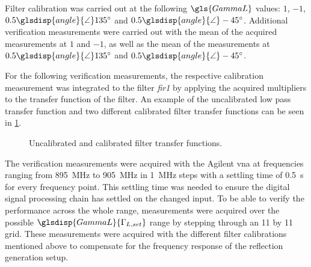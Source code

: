 \documentclass[12pt,a4paper,parskip=full,abstract=true,BCOR=12mm,twoside,open=right]{scrreprt}
\providecommand{\abs}[1]{\lvert#1\rvert}
\def\device#1{\textit{#1}}
\newcommand{\Angle}{\glsdisp{angle}{\angle}}
\begin{document}
Filter calibration was carried out at the following $\gls{GammaL}$
values: $1$, $-1$, $0.5\Angle\SI{135}{\degree}$ and $0.5\Angle\SI{-45}{\degree}$. Additional
verification measurements were carried out with the mean of the acquired measurements
at $1$ and $-1$, as well as the mean of the measurements at $0.5\Angle\SI{135}{\degree}$
and $0.5\Angle\SI{-45}{\degree}$.

For the following verification measurements, the respective calibration measurement
was integrated to the filter \device{fir1} by applying the acquired multipliers
to the transfer function of the filter. An example of the uncalibrated low pass
transfer function and two different calibrated filter transfer functions can be
seen in \cref{fig:filter}.

\begin{figure}[htb]
    \centering
    \caption{Uncalibrated and calibrated filter transfer functions.}
    \label{fig:filter}
\end{figure}

The verification measurements were acquired with the Agilent \gls{vna} at frequencies
ranging from \SI{895}{\mega\hertz} to \SI{905}{\mega\hertz} in \SI{1}{\mega\hertz} steps
with a settling time of \SI{0.5}{\second} for every frequency point. This settling time
was needed to ensure the digital signal processing chain has settled on the changed input.
To be able to verify the performance across the whole range, measurements were acquired over the possible
$\glsdisp{GammaL}{\Gamma_{L,set}}$ range by stepping through an 11 by 11 grid. These measurements were
acquired with the different filter calibrations mentioned above to compensate for the
frequency response of the reflection generation setup.
\end{document}
